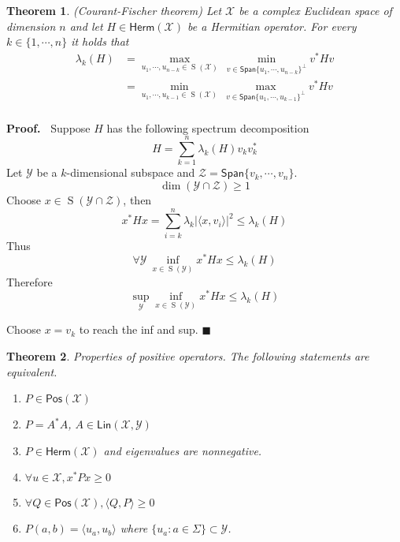 \documentclass[aps,pra,onecolumn,notitlepage,superscriptaddress]{revtex4-1}
\newcommand{\spc}[1]{\mathcal{#1}}
\newcommand{\Span}{{\mathsf{Span}}}
\newcommand{\Lin}{\mathsf{Lin}}
\newcommand{\Pos}{\mathsf{Pos}}
\newcommand{\Herm}{\mathsf{Herm}}
\def\>{\rangle}
\def\<{\langle}
\newcommand{\op}[1]{\operatorname{#1}}
\newtheorem{theo}{Theorem}
\def\Proof{{\bf Proof.~}}
\def\qed{$\blacksquare$ \newline}
\begin{document}
    \begin{theo}
        (Courant-Fischer theorem) Let $\spc X$ be a complex Euclidean space of dimension $n$ and let $H \in \Herm(\spc X)$ be a Hermitian operator. For every $k \in \{1, \cdots ,n\}$ it holds that
        \begin{align*}
            \lambda_k(H) 
            &= \max_{u_1, \cdots, u_{n-k} \in \op S(\spc X)} \ \min_{v \in \Span\{u_1, \cdots, u_{n-k}\}^\perp} v^*Hv \\
            &= \min_{u_1, \cdots, u_{k-1} \in \op S(\spc X)} \ \max_{v \in \Span\{u_1, \cdots, u_{k-1}\}^\perp} v^*Hv \\
        \end{align*}
    \end{theo}
    \Proof
    Suppose $H$ has the following spectrum decomposition
    \begin{equation}
        H = \sum_{k=1}^n \lambda_k(H) v_kv_k^*
    \end{equation}
    Let $\spc Y$ be a $k$-dimensional subspace and $\spc Z = \Span \{ v_k, \cdots, v_n \}$. 
    \begin{equation}
        \dim (\spc Y \cap \spc Z) \geq 1
    \end{equation}
    Choose $x \in \op S(\spc Y \cap \spc Z)$, then
    \begin{equation}
        x^* H x = \sum_{i=k}^n \lambda_k |\< x, v_i \>|^2 \leq \lambda_k(H)
    \end{equation}
    Thus
    \begin{equation}
        \forall \spc Y \ \inf_{x \in \op S(\spc Y)} x^* H x \leq \lambda_k(H)
    \end{equation}
    Therefore
    \begin{equation}
        \sup_{\spc Y} \inf_{x \in \op S(\spc Y)} x^* H x \leq \lambda_k(H)
    \end{equation}

    Choose $x = v_k$ to reach the inf and sup. \qed

    \begin{theo}
        Properties of positive operators. The following statements are equivalent.
        \begin{enumerate}
            \item $P \in \Pos(\spc X)$
            \item $P = A^*A$, $A \in \Lin(\spc X, \spc Y)$
            \item $P \in \Herm(\spc X)$ and eigenvalues are nonnegative.
            \item $\forall u \in \spc X, x^*Px \geq 0$
            \item $\forall Q \in \Pos(\spc X), \<Q,P\> \geq 0$
            \item $P(a,b) = \< u_a, u_b \>$ where $\{u_a : a \in \Sigma \} \subset \spc Y$.
        \end{enumerate}
    \end{theo}
    
\end{document}
